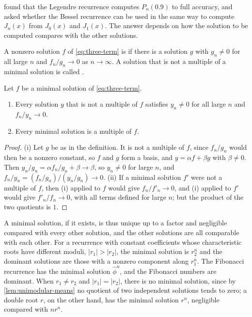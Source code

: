  found that the Legendre recurrence computes $P_n(0.9)$ to full accuracy, and asked whether the Bessel recurrence can be used in the same way to compute $J_n(x)$ from $J_0(x)$ and $J_1(x)$. The answer depends on how the solution to be computed compares with the other solutions.

\begin{definition}
\label{def:minimal-solution}
A nonzero solution $f$ of \eqref{eq:three-term} is  if there is a solution $g$ with $g_n\ne0$ for all large $n$ and $f_n/g_n\to0$ as $n\to\infty$. A solution that is not a multiple of a minimal solution is called .
\end{definition}

\begin{proposition}
\label{prop:minimal-unique}
Let $f$ be a minimal solution of \eqref{eq:three-term}.
\begin{enumerate}
\item Every solution $y$ that is not a multiple of $f$ satisfies $y_n\ne0$ for all large $n$ and $f_n/y_n\to0$.
\item Every minimal solution is a multiple of $f$.
\end{enumerate}
\end{proposition}

\begin{proof}
(i) Let $g$ be as in the definition. It is not a multiple of $f$, since $f_n/g_n$ would then be a nonzero constant, so $f$ and $g$ form a basis, and $y=\alpha f+\beta g$ with $\beta\ne0$. Then $y_n/g_n=\alpha f_n/g_n+\beta\to\beta$, so $y_n\ne0$ for large $n$, and $f_n/y_n=(f_n/g_n)/(y_n/g_n)\to0$. (ii) If a minimal solution $f'$ were not a multiple of $f$, then (i) applied to $f$ would give $f_n/f'_n\to0$, and (i) applied to $f'$ would give $f'_n/f_n\to0$, with all terms defined for large $n$; but the product of the two quotients is $1$.
\end{proof}

A minimal solution, if it exists, is thus unique up to a factor and negligible compared with every other solution, and the other solutions are all comparable with each other. For a recurrence with constant coefficients whose characteristic roots have different moduli, $|r_1|>|r_2|$, the minimal solution is $r_2^n$ and the dominant solutions are those with a nonzero component along $r_1^n$. The Fibonacci recurrence has the minimal solution $\hat\phi^n$, and the Fibonacci numbers are dominant. When $r_1\ne r_2$ and $|r_1|=|r_2|$, there is no minimal solution, since by \cref{lem:unimodular-means} no quotient of two independent solutions tends to zero; a double root $r$, on the other hand, has the minimal solution $r^n$, negligible compared with $nr^n$.

